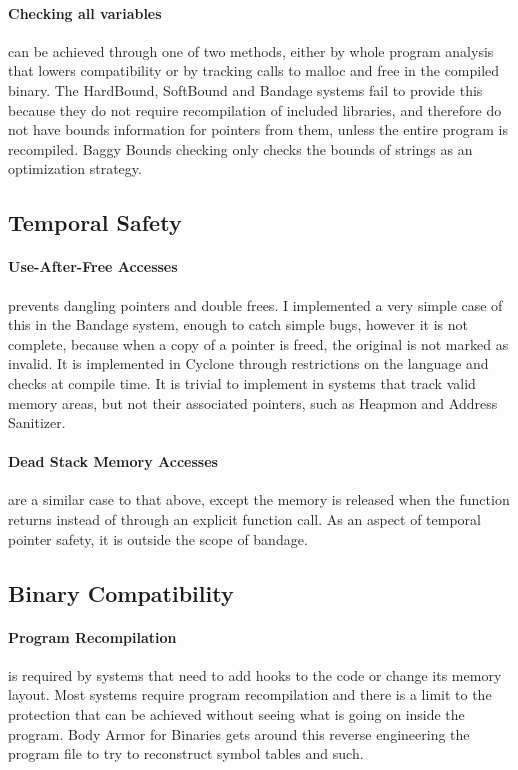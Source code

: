 \paragraph{Checking all variables} can be achieved through one of two methods, either by whole program analysis that lowers compatibility or by tracking calls to malloc and free in the compiled binary.
The HardBound, SoftBound and Bandage systems fail to provide this because they do not require recompilation of included libraries, and therefore do not have bounds information for pointers from them, unless the entire program is recompiled.
Baggy Bounds checking only checks the bounds of strings as an optimization strategy.

\subsection{Temporal Safety}

\paragraph{Use-After-Free Accesses} prevents dangling pointers and double frees.
I implemented a very simple case of this in the Bandage system, enough to catch simple bugs, however it is not complete, because when a copy of a pointer is freed, the original is not marked as invalid.
It is implemented in Cyclone through restrictions on the language and checks at compile time.
It is trivial to implement in systems that track valid memory areas, but not their associated pointers, such as Heapmon and Address Sanitizer.

\paragraph{Dead Stack Memory Accesses} are a similar case to that above, except the memory is released when the function returns instead of through an explicit function call.
As an aspect of temporal pointer safety, it is outside the scope of bandage.

\subsection{Binary Compatibility}

\paragraph{Program Recompilation} is required by systems that need to add hooks to the code or change its memory layout.
Most systems require program recompilation and there is a limit to the protection that can be achieved without seeing what is going on inside the program.
Body Armor for Binaries gets around this reverse engineering the program file to try to reconstruct symbol tables and such.

